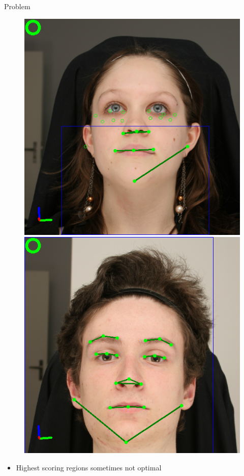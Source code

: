 \documentclass{beamer}
\begin{document}
\begin{frame}{Problem}
\begin{figure}
\centering
\includegraphics[scale=0.25]{fig/example_bad_box}
\includegraphics[scale=0.25]{fig/example_good_box}
\end{figure}
\begin{itemize}
\item Highest scoring regions sometimes not optimal
\end{itemize}
\end{frame}
\end{document}
